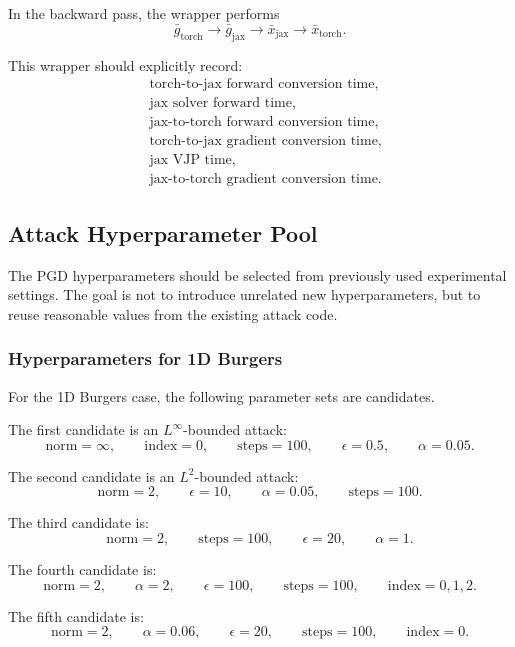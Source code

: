 \documentclass{article}
\begin{document}
In the backward pass, the wrapper performs
\[
\bar{g}_{\mathrm{torch}}
\rightarrow
\bar{g}_{\mathrm{jax}}
\rightarrow
\bar{x}_{\mathrm{jax}}
\rightarrow
\bar{x}_{\mathrm{torch}}.
\]

This wrapper should explicitly record:
\[
\begin{aligned}
&\text{torch-to-jax forward conversion time},\\
&\text{jax solver forward time},\\
&\text{jax-to-torch forward conversion time},\\
&\text{torch-to-jax gradient conversion time},\\
&\text{jax VJP time},\\
&\text{jax-to-torch gradient conversion time}.
\end{aligned}
\]

\subsection{Attack Hyperparameter Pool}

The PGD hyperparameters should be selected from previously used experimental settings. The goal is not to introduce unrelated new hyperparameters, but to reuse reasonable values from the existing attack code.

\subsubsection{Hyperparameters for 1D Burgers}

For the 1D Burgers case, the following parameter sets are candidates.

The first candidate is an \(L^{\infty}\)-bounded attack:
\[
\text{norm}=\infty,
\qquad
\text{index}=0,
\qquad
\text{steps}=100,
\qquad
\epsilon=0.5,
\qquad
\alpha=0.05.
\]

The second candidate is an \(L^2\)-bounded attack:
\[
\text{norm}=2,
\qquad
\epsilon=10,
\qquad
\alpha=0.05,
\qquad
\text{steps}=100.
\]

The third candidate is:
\[
\text{norm}=2,
\qquad
\text{steps}=100,
\qquad
\epsilon=20,
\qquad
\alpha=1.
\]

The fourth candidate is:
\[
\text{norm}=2,
\qquad
\alpha=2,
\qquad
\epsilon=100,
\qquad
\text{steps}=100,
\qquad
\text{index}=0,1,2.
\]

The fifth candidate is:
\[
\text{norm}=2,
\qquad
\alpha=0.06,
\qquad
\epsilon=20,
\qquad
\text{steps}=100,
\qquad
\text{index}=0.
\]
\end{document}

